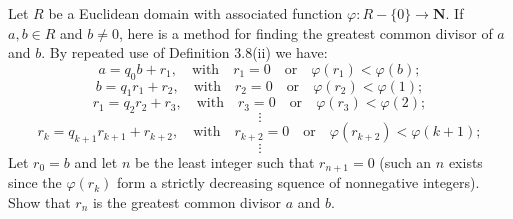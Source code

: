 \begin{ex}
    Let $R$ be a Euclidean domain with associated function $\varphi :R-\{0\}\to \mathbf{N}$. If $a,b\in R$ and $b\neq 0$, here is a method for finding the greatest common divisor of $a$ and $b$. By repeated use of Definition 3.8(ii) we have:
    \[a=q_{0}b+r_{1},\quad\text{with}\quad r_{1}=0\quad\text{or}\quad\varphi(r_{1})<\varphi(b);\]
    \[b=q_{1}r_{1}+r_{2},\quad\text{with}\quad r_{2}=0\quad\text{or}\quad\varphi(r_{2})<\varphi(1);\]
    \[r_{1}=q_{2}r_{2}+r_{3},\quad\text{with}\quad r_{3}=0\quad\text{or}\quad\varphi(r_{3})<\varphi(2);\]
    \[\vdots\]
    \[r_{k}=q_{k+1}r_{k+1}+r_{k+2},\quad\text{with}\quad r_{k+2}=0\quad\text{or}\quad\varphi(r_{k+2})<\varphi(k+1);\]
    \[\vdots\]
    Let $r_{0}=b$ and let $n$ be the least integer such that $r_{n+1}=0$ (such an $n$ exists since the $\varphi(r_{k})$ form a strictly decreasing squence of nonnegative integers). Show that $r_{n}$ is the greatest common divisor $a$ and $b$.
\end{ex}